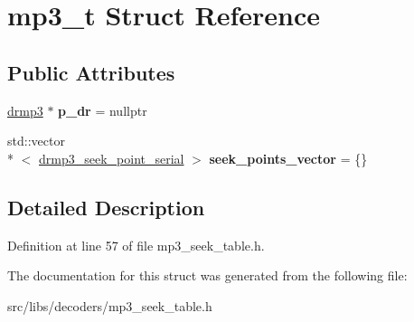 \hypertarget{structmp3__t}{\section{mp3\-\_\-t Struct Reference}
\label{structmp3__t}
}
\subsection*{Public Attributes}
\begin{DoxyCompactItemize}
\item 
\hypertarget{structmp3__t_a7b853ca10b3eab37616351536385f9d3}{\hyperlink{structdrmp3}{drmp3} $\ast$ {\bfseries p\-\_\-dr} = nullptr}\label{structmp3__t_a7b853ca10b3eab37616351536385f9d3}

\item 
\hypertarget{structmp3__t_a4dd1f4904273474b62fd1a1387c8028f}{std\-::vector\\*
$<$ \hyperlink{structdrmp3__seek__point__serial}{drmp3\-\_\-seek\-\_\-point\-\_\-serial} $>$ {\bfseries seek\-\_\-points\-\_\-vector} = \{\}}\label{structmp3__t_a4dd1f4904273474b62fd1a1387c8028f}

\end{DoxyCompactItemize}


\subsection{Detailed Description}


Definition at line 57 of file mp3\-\_\-seek\-\_\-table.\-h.



The documentation for this struct was generated from the following file\-:\begin{DoxyCompactItemize}
\item 
src/libs/decoders/mp3\-\_\-seek\-\_\-table.\-h\end{DoxyCompactItemize}
